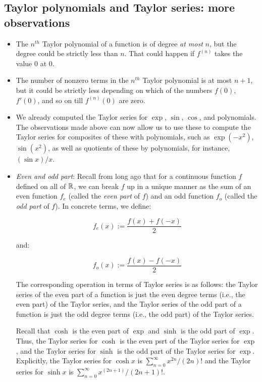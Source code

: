 \documentclass{amsart}
\begin{document}
\subsection{Taylor polynomials and Taylor series: more observations}

\begin{itemize}
\item The $n^{th}$ Taylor polynomial of a function is of degree {\em
  at most} $n$, but the degree could be strictly less than $n$. That
  could happen if $f^{(n)}$ takes the value $0$ at $0$.
\item The number of nonzero terms in the $n^{th}$ Taylor polynomial is
  at most $n + 1$, but it could be strictly less depending on which of
  the numbers $f(0)$, $f'(0)$, and so on till $f^{(n)}(0)$ are zero.
\item We already computed the Taylor series for $\exp$, $\sin$,
  $\cos$, and polynomials. The observations made above can now allow
  us to use these to compute the Taylor series for composites of these
  with polynomials, such as $\exp(-x^2)$, $\sin(x^2)$, as well as
  quotients of these by polynomials, for instance, $(\sin x)/x$.
\item {\em Even and odd part}: Recall from long ago that for a
  continuous function $f$ defined on all of $\mathbb{R}$, we can break $f$ up
  in a unique manner as the sum of an even function $f_e$ (called the
  {\em even part} of $f$) and an odd function $f_o$ (called the {\em
  odd part} of $f$). In concrete terms, we define:

  $$f_e(x) := \frac{f(x) + f(-x)}{2}$$

  and:

  $$f_o(x) := \frac{f(x) - f(-x)}{2}$$

  The corresponding operation in terms of Taylor series is as follows:
  the Taylor series of the even part of a function is just the even
  degree terms (i.e., the even part) of the Taylor series, and the
  Taylor series of the odd part of a function is just the odd degree
  terms (i.e., the odd part) of the Taylor series.

  Recall that $\cosh$ is the even part of $\exp$ and $\sinh$ is the
  odd part of $\exp$. Thus, the Taylor series for $\cosh$ is the even
  psrt of the Taylor series for $\exp$, and the Taylor series for
  $\sinh$ is the odd part of the Taylor series for $\exp$. Explicitly,
  the Taylor series for $\cosh x$ is $\sum_{n=0}^\infty x^{2n}/(2n)!$
  and the Taylor series for $\sinh x$ is $\sum_{n=0}^\infty x^{(2n +
  1)}/(2n + 1)!$.
\end{itemize}
\end{document}
